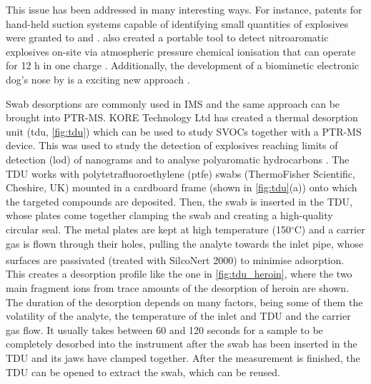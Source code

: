 This issue has been addressed in many interesting ways.
%
For instance, patents for hand-held suction systems capable of identifying small quantities of explosives were granted to \citeauthor{conrad1992hand} and \citeauthor{carroll1992hand} \cite{conrad1992hand,carroll1992hand}.
%
\citeauthor{jjunju2015hand} also created a portable tool to detect nitroaromatic explosives on-site via atmospheric pressure chemical ionisation that can operate for 12 h in one charge \cite{jjunju2015hand}.
%
Additionally, the development of a biomimetic electronic dog's nose by \citeauthor{staymates2016biomimetic} is a exciting new approach \cite{staymates2016biomimetic}.



Swab desorptions are commonly used in  IMS  and the same approach can be brought into PTR-MS.
%
KORE Technology Ltd has created a thermal desorption unit (\acrshort{tdu}, \autoref{fig:tdu}) which can be used to study SVOCs together with a PTR-MS device.
%
This was used to study the detection of explosives reaching limits of detection (\acrshort{lod}) of nanograms \cite{RN445} and to analyse polyaromatic hydrocarbons \cite{blenkhorn2019novel}.
%
The TDU works with polytetrafluoroethylene (\acrshort{ptfe}) swabs (ThermoFisher Scientific, Cheshire, UK) mounted in a cardboard frame (shown in \autoref{fig:tdu}(a)) onto which the targeted compounds are deposited.
%
Then, the swab is inserted in the TDU, whose plates come together clamping the swab and creating a high-quality circular seal. The metal plates are kept at high temperature (150$^{\circ}$C) and a carrier gas is flown through their holes, pulling the analyte towards the inlet pipe, whose surfaces are passivated (treated with SilcoNert\textsuperscript{\textregistered} 2000) to minimise adsorption.
%
This creates a desorption profile like the one in \autoref{fig:tdu_heroin}, where the two main fragment ions from trace amounts of the desorption of heroin are shown.
%
The duration of the desorption depends on many factors, being some of them the volatility of the analyte, the temperature of the inlet and TDU and the carrier gas flow.
%
It usually takes between 60 and 120 seconds for a sample to be completely desorbed into the instrument after the swab has been inserted in the TDU and its jaws have clamped together. After the measurement is finished, the TDU can be opened to extract the swab, which can be reused.







